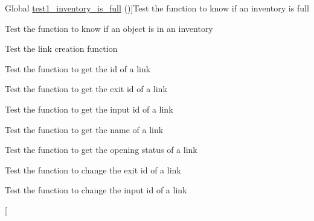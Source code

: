 \begin{DoxyRefList}
%
Global \hyperlink{inventory__test_8c_a7eb3ba387e33c42ff45331c9d9aada34}{test1\+\_\+inventory\+\_\+is\+\_\+full} ()]Test the function to know if an inventory is full  
\item[\label{test__test000067}%
\Hypertarget{test__test000067}%
Global \hyperlink{inventory__test_8c_a19a0bada9e0ce0def239c2b9523ccfea}{test1\+\_\+inventory\+\_\+is\+\_\+object} ()]Test the function to know if an object is in an inventory  
\item[\label{test__test000081}%
\Hypertarget{test__test000081}%
Global \hyperlink{link__test_8c_a82c5ee441ad22caad8272212a9e9cc26}{test1\+\_\+link\+\_\+create} ()]Test the link creation function  
\item[\label{test__test000092}%
\Hypertarget{test__test000092}%
Global \hyperlink{link__test_8c_a19c70f79fd51d123173f7aaf6ae50bf8}{test1\+\_\+link\+\_\+get\+\_\+id} ()]Test the function to get the id of a link  
\item[\label{test__test000097}%
\Hypertarget{test__test000097}%
Global \hyperlink{link__test_8c_ac45f246d7f9b1d21535c743bbb970a85}{test1\+\_\+link\+\_\+get\+\_\+id1} ()]Test the function to get the exit id of a link  
\item[\label{test__test000099}%
\Hypertarget{test__test000099}%
Global \hyperlink{link__test_8c_aeaa87091cae85a91de5db2c755d4eee9}{test1\+\_\+link\+\_\+get\+\_\+id2} ()]Test the function to get the input id of a link  
\item[\label{test__test000101}%
\Hypertarget{test__test000101}%
Global \hyperlink{link__test_8c_a044128db00a5cc385d7157dea8bdf3c3}{test1\+\_\+link\+\_\+get\+\_\+name} ()]Test the function to get the name of a link  
\item[\label{test__test000094}%
\Hypertarget{test__test000094}%
Global \hyperlink{link__test_8c_ac3124af4c90d4769cd6e42849817528c}{test1\+\_\+link\+\_\+is\+\_\+open} ()]Test the function to get the opening status of a link  
\item[\label{test__test000085}%
\Hypertarget{test__test000085}%
Global \hyperlink{link__test_8c_a42d2fdbe0afa812eb94b9332ab8c3b79}{test1\+\_\+link\+\_\+set\+\_\+id1} ()]Test the function to change the exit id of a link  
\item[\label{test__test000087}%
\Hypertarget{test__test000087}%
Global \hyperlink{link__test_8c_aa4ea6550c6521090364bb423a97724d3}{test1\+\_\+link\+\_\+set\+\_\+id2} ()]Test the function to change the input id of a link  
\item[\label{test__test000083}%

\end{DoxyRefList}
